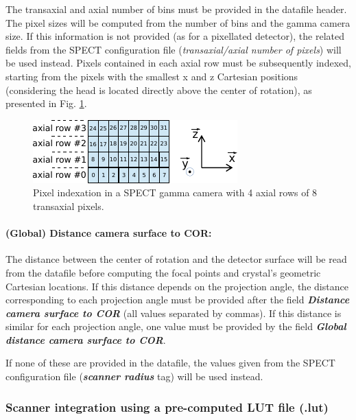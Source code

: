 \documentclass[a4paper, 11pt]{article}
\begin{document}
The transaxial and axial number of bins must be provided in the datafile header. The pixel sizes will be computed from the number of bins and the gamma camera size. If this information is not provided (as for a pixellated detector),
the related fields from the SPECT configuration file (\textit{transaxial/axial number of pixels}) will be used instead. Pixels contained in each axial row must be subsequently indexed, starting from the pixels with the smallest x and z Cartesian positions (considering the head is located directly above the center of rotation), as presented in Fig. \ref{fig_pixel_indexation_spect}. 

\begin{figure} [h!]
  \centering
  \includegraphics[width=0.4\columnwidth]{./figures/indexation_SPECT.pdf}
  \caption{Pixel indexation in a SPECT gamma camera with 4 axial rows of 8 transaxial pixels.}
  \label{fig_pixel_indexation_spect}
\end{figure}


\paragraph{(Global) Distance camera surface to COR:}

The distance between the center of rotation and the detector surface will be read from the datafile before computing the focal points and crystal's
geometric Cartesian locations. If this distance depends on the projection angle, the distance corresponding to each projection angle must be
provided after the field \textbf{\textit{Distance camera surface to COR}} (all values separated by commas). If this distance is similar for each
projection angle, one value must be provided by the field \textbf{\textit{Global distance camera surface to COR}}.

If none of these are provided in the datafile, the values given from the SPECT configuration file (\textbf{\textit{scanner radius}} tag)
will be used instead.

\subsubsection{Scanner integration using a pre-computed LUT file (.lut)}
\label{sss_scanner_integration_SPECT_uLUT}
\end{document}
